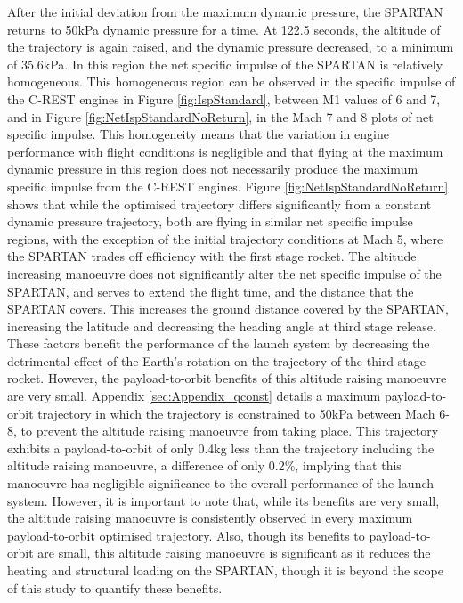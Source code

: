 After the initial deviation from the maximum dynamic pressure, the SPARTAN returns to 50kPa dynamic pressure for a time. 
At 122.5 seconds, the altitude of the trajectory is again raised, and the dynamic pressure decreased, to a minimum of 35.6kPa. In this region the net specific impulse of the SPARTAN is relatively homogeneous. This homogeneous region can be observed in the specific impulse of the C-REST engines in Figure \ref{fig:IspStandard}, between M1 values of 6 and 7, and in Figure \ref{fig:NetIspStandardNoReturn}, in the Mach 7 and 8 plots of net specific impulse. This homogeneity means that the variation in engine performance with flight conditions is negligible and that flying at the maximum dynamic pressure in this region does not necessarily produce the maximum specific impulse from the C-REST engines. Figure \ref{fig:NetIspStandardNoReturn} shows that while the optimised trajectory differs significantly from a constant dynamic pressure trajectory, both are flying in similar net specific impulse regions, with the exception of the initial trajectory conditions at Mach 5, where the SPARTAN trades off efficiency with the first stage rocket. 
The altitude increasing manoeuvre does not significantly alter the net specific impulse of the SPARTAN, and serves to extend the flight time, and the distance that the SPARTAN covers. This increases the ground distance covered by the SPARTAN, increasing the latitude and decreasing the heading angle at third stage release. These factors benefit the performance of the launch system by decreasing the detrimental effect of the Earth's rotation on the trajectory of the third stage rocket. 
However, the payload-to-orbit benefits of this altitude raising manoeuvre are very small. Appendix \ref{sec:Appendix_qconst} details a maximum payload-to-orbit trajectory in which the trajectory is constrained to 50kPa between Mach 6-8, to prevent the altitude raising manoeuvre from taking place. This trajectory exhibits a payload-to-orbit of only 0.4kg less than the trajectory including the altitude raising manoeuvre, a difference of only 0.2\%, implying that this manoeuvre has negligible significance to the overall performance of the launch system. 
However, it is important to note that, while its benefits are very small, the altitude raising manoeuvre is consistently observed in every maximum payload-to-orbit optimised trajectory. 
Also, though its benefits to payload-to-orbit are small, this altitude raising manoeuvre is significant as it reduces the heating and structural loading on the SPARTAN, though it is beyond the scope of this study to quantify these benefits. 





